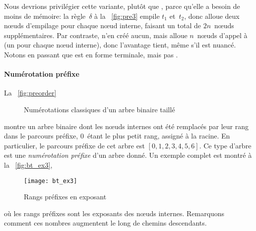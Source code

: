 Nous devrions privilégier cette variante, plutôt que
, parce qu'elle a
besoin de moins de mémoire: la règle~\(\delta\) à la
\fig~\vref{fig:pre3} empile \(t_1\) et~\(t_2\), donc alloue deux
nœuds d'empilage pour chaque nœud
interne, faisant un total de \(2n\)~nœuds supplémentaires. Par
contraste,  n'en créé aucun, mais
alloue \(n\)~nœuds d'appel à 
(un pour chaque nœud interne), donc l'avantage tient, même s'il
est nuancé. Notons en passant que
 est en forme
terminale, mais pas
.

\paragraph{Numérotation préfixe}

La \fig~\vref{fig:preorder}
\begin{figure}[b]
\centering
{}
\;
\;
\;
\caption{Numérotations classiques d'un arbre binaire taillé}
\label{fig:orders}
\end{figure}
montre un arbre binaire dont les nœuds internes ont été remplacés
par leur rang dans le parcours préfixe, \(0\)~étant le plus petit
rang, assigné à la racine. En particulier, le parcours préfixe de cet
arbre est \([0,1,2,3,4,5,6]\). Ce type d'arbre est une
\emph{numérotation préfixe}
d'un arbre donné. Un exemple complet est montré à la
\fig~\vref{fig:bt_ex3},
\begin{figure}
\centering
\texttt{[image: bt\_ex3]}
\caption{Rangs préfixes en exposant}
\label{fig:bt_ex3}
\end{figure}
où les rangs préfixes sont les exposants des nœuds
internes. Remarquons comment ces nombres augmentent le long de chemins
descendants.

